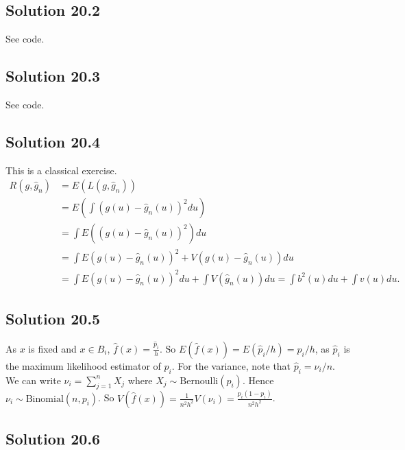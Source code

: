 \subsection*{Solution 20.2}

See code.


\subsection*{Solution 20.3}

See code.


\subsection*{Solution 20.4}

This is a classical exercise.
\begin{equation*}
    \begin{split}
        R(g, \hat{g}_n)
            &= E(L(g, \hat{g}_n)) \\
            &= E\left(\int (g(u) - \hat{g}_n(u))^2 du\right) \\
            &= \int E((g(u) - \hat{g}_n(u))^2) du \\
            &= \int E(g(u) - \hat{g}_n(u))^2 + V(g(u) - \hat{g}_n(u)) du \\
            &= \int E(g(u) - \hat{g}_n(u))^2 du + \int V(\hat{g}_n(u)) du
            = \int b^2(u) du + \int v(u) du.
    \end{split}
\end{equation*}


\subsection*{Solution 20.5}

As $x$ is fixed and $x \in B_i$, $\hat{f}(x) = \frac{\hat{p}_i}{h}$.
So $E(\hat{f}(x)) = E(\hat{p}_i/h) = p_i/h$, as $\hat{p}_i$ is the maximum likelihood estimator of $p_i$.
For the variance, note that $\hat{p}_i = \nu_i / n$.
We can write $\nu_i = \sum_{j=1}^n X_j$ where $X_j \sim \mathrm{Bernoulli}(p_i)$.
Hence $\nu_i \sim \mathrm{Binomial}(n, p_i)$.
So $V(\hat{f}(x)) = \frac{1}{n^2 h^2} V(\nu_i) = \frac{p_i(1 - p_i)}{n^2 h^2}$.


\subsection*{Solution 20.6}

